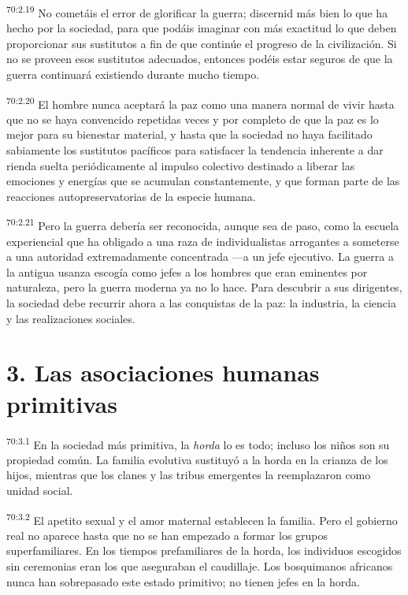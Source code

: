 \par
\textsuperscript{70:2.19} No cometáis el error de glorificar la guerra; discernid más bien lo que ha hecho por la sociedad, para que podáis imaginar con más exactitud lo que deben proporcionar sus sustitutos a fin de que continúe el progreso de la civilización. Si no se proveen esos sustitutos adecuados, entonces podéis estar seguros de que la guerra continuará existiendo durante mucho tiempo.

\par
\textsuperscript{70:2.20} El hombre nunca aceptará la paz como una manera normal de vivir hasta que no se haya convencido repetidas veces y por completo de que la paz es lo mejor para su bienestar material, y hasta que la sociedad no haya facilitado sabiamente los sustitutos pacíficos para satisfacer la tendencia inherente a dar rienda suelta periódicamente al impulso colectivo destinado a liberar las emociones y energías que se acumulan constantemente, y que forman parte de las reacciones autopreservatorias de la especie humana.

\par
\textsuperscript{70:2.21} Pero la guerra debería ser reconocida, aunque sea de paso, como la escuela experiencial que ha obligado a una raza de individualistas arrogantes a someterse a una autoridad extremadamente concentrada ---a un jefe ejecutivo. La guerra a la antigua usanza escogía como jefes a los hombres que eran eminentes por naturaleza, pero la guerra moderna ya no lo hace. Para descubrir a sus dirigentes, la sociedad debe recurrir ahora a las conquistas de la paz: la industria, la ciencia y las realizaciones sociales.

\section*{3. Las asociaciones humanas primitivas}
\par
\textsuperscript{70:3.1} En la sociedad más primitiva, la \textit{horda} lo es todo; incluso los niños son su propiedad común. La familia evolutiva sustituyó a la horda en la crianza de los hijos, mientras que los clanes y las tribus emergentes la reemplazaron como unidad social.

\par
\textsuperscript{70:3.2} El apetito sexual y el amor maternal establecen la familia. Pero el gobierno real no aparece hasta que no se han empezado a formar los grupos superfamiliares. En los tiempos prefamiliares de la horda, los individuos escogidos sin ceremonias eran los que aseguraban el caudillaje. Los bosquimanos africanos nunca han sobrepasado este estado primitivo; no tienen jefes en la horda.

